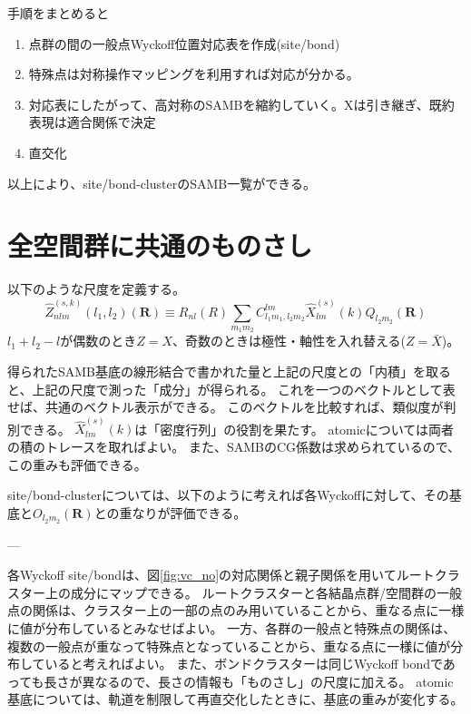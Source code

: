 \documentclass[11pt]{easymemo}
\begin{document}
手順をまとめると
\begin{enumerate}
\item 点群の間の一般点Wyckoff位置対応表を作成(site/bond)
\item 特殊点は対称操作マッピングを利用すれば対応が分かる。
\item 対応表にしたがって、高対称のSAMBを縮約していく。Xは引き継ぎ、既約表現は適合関係で決定
\item 直交化
\end{enumerate}
以上により、site/bond-clusterのSAMB一覧ができる。

\section{全空間群に共通のものさし}
以下のような尺度を定義する。
\[
\hat{Z}_{nlm}^{(s,k)}(l_1,l_2)(\bm{R})
\equiv R_{nl}(R)\sum_{m_1m_2}C_{l_1m_1,l_2m_2}^{lm}\hat{X}_{lm}^{(s)}(k)Q_{l_2m_2}(\bm{R})
\]
$l_1+l_2-l$が偶数のとき$Z=X$、奇数のときは極性・軸性を入れ替える($Z=\bar{X}$)。

得られたSAMB基底の線形結合で書かれた量と上記の尺度との「内積」を取ると、上記の尺度で測った「成分」が得られる。
これを一つのベクトルとして表せば、共通のベクトル表示ができる。
このベクトルを比較すれば、類似度が判別できる。
$\hat{X}_{lm}^{(s)}(k)$は「密度行列」の役割を果たす。
atomicについては両者の積のトレースを取ればよい。
また、SAMBのCG係数は求められているので、この重みも評価できる。

site/bond-clusterについては、以下のように考えれば各Wyckoffに対して、その基底と$O_{l_2m_2}(\bm{R})$との重なりが評価できる。

---

各Wyckoff site/bondは、図\ref{fig:vc_no}の対応関係と親子関係を用いてルートクラスター上の成分にマップできる。
ルートクラスターと各結晶点群/空間群の一般点の関係は、クラスター上の一部の点のみ用いていることから、重なる点に一様に値が分布しているとみなせばよい。
一方、各群の一般点と特殊点の関係は、複数の一般点が重なって特殊点となっていることから、重なる点に一様に値が分布していると考えればよい。
また、ボンドクラスターは同じWyckoff bondであっても長さが異なるので、長さの情報も「ものさし」の尺度に加える。
atomic基底については、軌道を制限して再直交化したときに、基底の重みが変化する。
\end{document}
